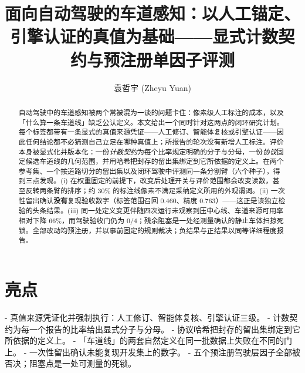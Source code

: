 \documentclass[journal]{IEEEtran}
\title{面向自动驾驶的车道感知：以人工锚定、引擎认证的真值为基础——显式计数契约与预注册单因子评测}
\author{袁哲宇 (Zheyu Yuan)}
\begin{document}
\maketitle
\begin{abstract}
自动驾驶中的车道感知被两个常被混为一谈的问题卡住：像素级人工标注的成本，以及「什么算一条车道线」缺乏公认定义。本文给出一个同时针对这两点的闭环研究计划。每个标签都带有一条显式的真值来源凭证------人工修订、智能体复核或引擎认证------因此任何结论都不必猜测自己立足在哪种真值上；所报告的轮次没有新增人工标注。评价本身被显式化并版本化：一份\emph{计数契约}为每个比率规定明确的分子与分母，一份\emph{协议}固定候选车道线的几何范围，并用哈希把封存的留出集绑定到它所依据的定义上。在两个参考集、一个按道路切分的留出集以及闭环驾驶中评测同一条分割臂（六个种子），得到三点发现。(i) 在权重固定的前提下，改变后处理开关与评价范围都会改变读数，甚至反转两条臂的排序；约 30\% 的标注线像素不满足采纳定义所用的外观谓词。(ii) 一次性留出确认\textbf{没有}复现验收数字（标签范围召回 0.460、精度 0.763）------这正是该独立检验的头条结果。(iii) 同一处定义变更伴随四次运行未观察到压中心线、车道来源可用率相对下降 66\%，而驾驶验收门仍为 0/4；残余阻塞是一处经测量确认的静止车体扫掠死锁。全部改动均预注册，并以事前固定的规则裁决；负结果与正结果以同等详细程度报告。
\end{abstract}

\section*{亮点}
- 真值来源凭证化并强制执行：人工修订、智能体复核、引擎认证三级。
- 计数契约为每一个报告的比率给出显式分子与分母。
- 协议哈希把封存的留出集绑定到它所依据的定义上。
- 「车道线」的两套自然定义在同一批数据上失败在不同的门上。
- 一次性留出确认未能复现开发集上的数字。
- 五个预注册驾驶层因子全部被否决；阻塞点是一处可测量的死锁。
\end{document}
